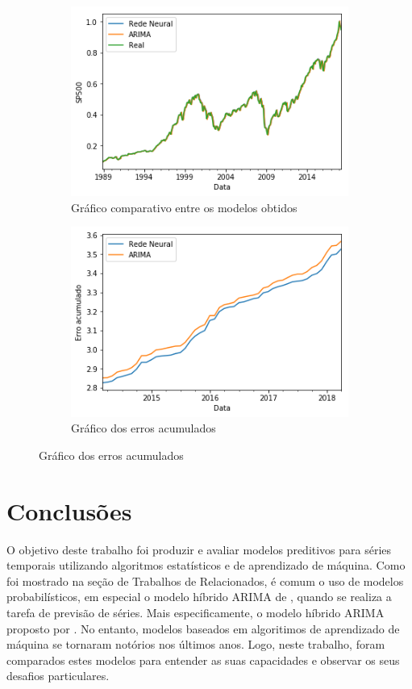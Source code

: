 \documentclass[
    12pt,
    oneside,
    a4paper,
    english,
    brazil
]{abntex2}
\begin{document}
\begin{figure}[ht]
    \caption{Comparativos dos resultados}
    \begin{subfigure}{.5\textwidth}
        \caption{Gráfico comparativo entre os modelos obtidos}\label{fig:comparesp500}
        \includegraphics[width=.8\linewidth]{images/sp500_prediction_compare.png}
    \end{subfigure}
    \begin{subfigure}{.5\textwidth}
        \caption{Gráfico dos erros acumulados}\label{fig:comparesp500}
        \includegraphics[width=.8\linewidth]{images/sp500_cumsum.png}
    \end{subfigure}
\end{figure}


\chapter{Conclusões}\label{chap:concl}

O objetivo deste trabalho foi produzir e avaliar modelos preditivos para séries
temporais utilizando  algoritmos estatísticos e de aprendizado de  máquina. Como foi mostrado na seção de Trabalhos de Relacionados, é comum o uso de modelos  probabilísticos, em especial o modelo híbrido ARIMA  de , quando  se  realiza  a tarefa  de  previsão  de séries.  Mais  especificamente, o  modelo
híbrido ARIMA  proposto por .  No entanto, modelos  baseados em
algoritimos de  aprendizado de máquina  se tornaram notórios nos  últimos anos.
Logo,  neste trabalho,  foram comparados  estes modelos  para entender  as suas
capacidades e observar os seus desafios particulares.
\end{document}
